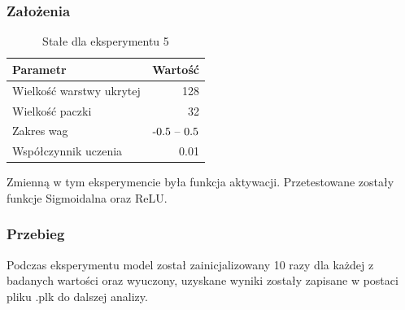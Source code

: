 \documentclass{article}
\begin{document}
\subsubsection*{Założenia}
\begin{table}[H]
	\caption{Stałe dla eksperymentu 5}
	\label{tabela-const-5}
	\centering
	\begin{tabular}{lr}
		\toprule
		Parametr                   & Wartość         \\
		\midrule
		Wielkość warstwy ukrytej & 128               \\
		Wielkość paczki          & 32                \\
		Zakres wag                 & \($-0.5 -- 0.5$\) \\
		Współczynnik uczenia     & 0.01              \\
		\bottomrule
	\end{tabular}
\end{table}

Zmienną w tym eksperymencie była funkcja aktywacji. Przetestowane zostały funkcje Sigmoidalna oraz ReLU.
\subsubsection*{Przebieg}

Podczas eksperymentu model został zainicjalizowany 10 razy dla każdej z badanych wartości oraz wyuczony, uzyskane wyniki zostały zapisane w postaci pliku .plk do dalszej analizy.
\end{document}
